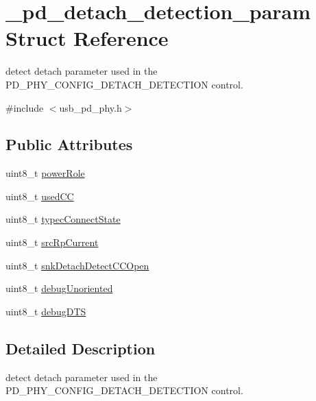 \hypertarget{struct__pd__detach__detection__param}{\section{\-\_\-pd\-\_\-detach\-\_\-detection\-\_\-param Struct Reference}
\label{struct__pd__detach__detection__param}
}


detect detach parameter used in the P\-D\-\_\-\-P\-H\-Y\-\_\-\-C\-O\-N\-F\-I\-G\-\_\-\-D\-E\-T\-A\-C\-H\-\_\-\-D\-E\-T\-E\-C\-T\-I\-O\-N control.  




{\ttfamily \#include $<$usb\-\_\-pd\-\_\-phy.\-h$>$}

\subsection*{Public Attributes}
\begin{DoxyCompactItemize}
\item 
uint8\-\_\-t \hyperlink{struct__pd__detach__detection__param_a83d3118f26d1bd19d41aa61885fec230}{power\-Role}
\item 
uint8\-\_\-t \hyperlink{struct__pd__detach__detection__param_ac0e0e85417ccfdbec7069854ca6a24d6}{used\-C\-C}
\item 
uint8\-\_\-t \hyperlink{struct__pd__detach__detection__param_a3972d78d7c87afef1c5d732aca07cacc}{typec\-Connect\-State}
\item 
uint8\-\_\-t \hyperlink{struct__pd__detach__detection__param_a9ba36d0a45cb600d503944f7edd5db7d}{src\-Rp\-Current}
\item 
uint8\-\_\-t \hyperlink{struct__pd__detach__detection__param_ada72749350ff49cdeedcd58803d75d99}{snk\-Detach\-Detect\-C\-C\-Open}
\item 
uint8\-\_\-t \hyperlink{struct__pd__detach__detection__param_af1d9e713e2c0aa658d8b20bf641b82f8}{debug\-Unoriented}
\item 
uint8\-\_\-t \hyperlink{struct__pd__detach__detection__param_ac94f35f2d29b440e1d4a221f693a877e}{debug\-D\-T\-S}
\end{DoxyCompactItemize}


\subsection{Detailed Description}
detect detach parameter used in the P\-D\-\_\-\-P\-H\-Y\-\_\-\-C\-O\-N\-F\-I\-G\-\_\-\-D\-E\-T\-A\-C\-H\-\_\-\-D\-E\-T\-E\-C\-T\-I\-O\-N control. 

